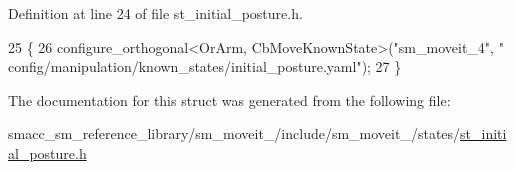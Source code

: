 Definition at line 24 of file st\+\_\+initial\+\_\+posture.\+h.


\begin{DoxyCode}
25         \{
26             configure\_orthogonal<OrArm, CbMoveKnownState>(\textcolor{stringliteral}{"sm\_moveit\_4"}, \textcolor{stringliteral}{"
      config/manipulation/known\_states/initial\_posture.yaml"});
27         \}
\end{DoxyCode}


The documentation for this struct was generated from the following file\+:\begin{DoxyCompactItemize}
\item 
smacc\+\_\+sm\+\_\+reference\+\_\+library/sm\+\_\+moveit\+\_/include/sm\+\_\+moveit\+\_/states/\hyperlink{4_2include_2sm__moveit__4_2states_2st__initial__posture_8h}{st\+\_\+initial\+\_\+posture.\+h}\end{DoxyCompactItemize}
